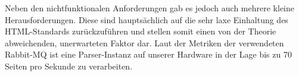 Neben den nichtfunktionalen Anforderungen gab es jedoch auch mehrere kleine Herausforderungen.
Diese sind hauptsächlich auf die sehr laxe Einhaltung des HTML-Standards zurückzuführen und stellen somit einen von
der Theorie abweichenden, unerwarteten Faktor dar.
Laut der Metriken der verwendeten Rabbit-MQ ist eine Parser-Instanz auf unserer Hardware in der Lage bis zu 70 Seiten
pro Sekunde zu verarbeiten.
